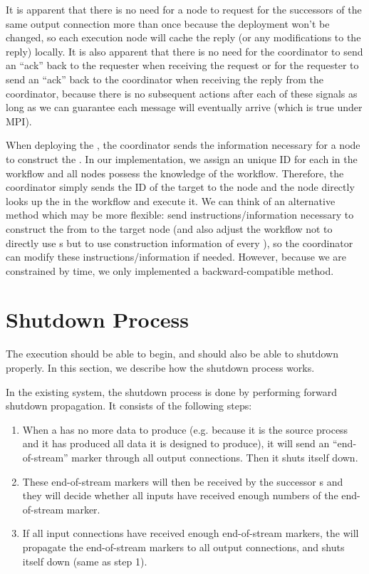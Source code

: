 It is apparent that there is no need for a node to request for the successors of the same output connection more than once because the deployment won't be changed, so each execution node will cache the reply (or any modifications to the reply) locally. It is also apparent that there is no need for the coordinator to send an ``ack'' back to the requester when receiving the request or for the requester to send an ``ack'' back to the coordinator when receiving the reply from the coordinator, because there is no subsequent actions after each of these signals as long as we can guarantee each message will eventually arrive (which is true under MPI).

When deploying the \tPEInst, the coordinator sends the information necessary for a node to construct the \tPEInst. In our implementation, we assign an unique ID for each \tPEInst in the workflow and all nodes possess the knowledge of the workflow. Therefore, the coordinator simply sends the ID of the target \tPEInst to the node and the node directly looks up the \tPEInst in the workflow and execute it. We can think of an alternative method which may be more flexible: send instructions/information necessary to construct the \tPEInst from \tPETmpl to the target node (and also adjust the workflow not to directly use \tPEInst{}s but to use construction information of every \tPEInst{}), so the coordinator can modify these instructions/information if needed. However, because we are constrained by time, we only implemented a backward-compatible method.

\section{Shutdown Process}
The execution should be able to begin, and should also be able to shutdown properly. In this section, we describe how the shutdown process works.

\newcommand{\dEOS}{end-of-stream\xspace}

In the existing \dpy system, the shutdown process is done by performing forward shutdown propagation. It consists of the following steps:
\begin{enumerate}
	\item When a \tPEInst has no more data to produce (e.g. because it is the source process and it has produced all data it is designed to produce), it will send an ``\dEOS'' marker through all output connections. Then it shuts itself down.
	\item These \dEOS markers will then be received by the successor \tPEInst{}s and they will decide whether all inputs have received enough numbers of the \dEOS marker.
	\item If all input connections have received enough \dEOS markers, the \tPEInst will propagate the \dEOS markers to all output connections, and shuts itself down (same as step 1).
\end{enumerate}

